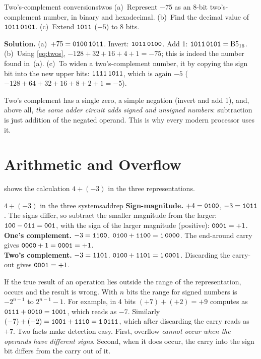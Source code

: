 \begin{example}{Two's-complement conversions}{twos}
(a)~Represent $-75$ as an 8-bit two's-complement number, in binary and hexadecimal. (b)~Find the decimal value of $\mathtt{1011\,0101}$. (c)~Extend $\mathtt{1011}$ ($-5$) to 8 bits.

\textbf{Solution.} (a)~$+75=\mathtt{0100\,1011}$. Invert: $\mathtt{1011\,0100}$. Add 1: $\mathtt{1011\,0101}=\mathrm{B5}_{16}$. (b)~Using \cref{eq:twos}, $-128+32+16+4+1=-75$; this is indeed the number found in~(a). (c)~To widen a two's-complement number,  it by copying the sign bit into the new upper bits: $\mathtt{1111\,1011}$, which is again $-5$ ($-128+64+32+16+8+2+1=-5$).
\end{example}

\begin{keypoint}
Two's complement has a single zero, a simple negation (invert and add 1), and, above all, \emph{the same adder circuit adds signed and unsigned numbers}: subtraction is just addition of the negated operand. This is why every modern processor uses it.
\end{keypoint}

\section{Arithmetic and Overflow}\label{sec:overflow}
 shows the calculation $4+(-3)$ in the three representations.

\begin{example}{$4+(-3)$ in the three systems}{addrep}
\textbf{Sign-magnitude.} $+4=\mathtt{0100}$, $-3=\mathtt{1011}$. The signs differ, so subtract the smaller magnitude from the larger: $\mathtt{100}-\mathtt{011}=\mathtt{001}$, with the sign of the larger magnitude (positive): $\mathtt{0001}=+1$.\\
\textbf{One's complement.} $-3=\mathtt{1100}$. $\mathtt{0100}+\mathtt{1100}=\mathtt{1\,0000}$. The end-around carry gives $\mathtt{0000}+1=\mathtt{0001}=+1$.\\
\textbf{Two's complement.} $-3=\mathtt{1101}$. $\mathtt{0100}+\mathtt{1101}=\mathtt{1\,0001}$. Discarding the carry-out gives $\mathtt{0001}=+1$.
\end{example}

If the true result of an operation lies outside the range of the representation,  occurs and the result is wrong. With $n$ bits the range for signed numbers is $-2^{n-1}$ to $2^{n-1}-1$. For example, in 4 bits $(+7)+(+2)=+9$ computes as $\mathtt{0111}+\mathtt{0010}=\mathtt{1001}$, which reads as $-7$. Similarly $(-7)+(-2)=\mathtt{1001}+\mathtt{1110}=\mathtt{1\,0111}$, which after discarding the carry reads as $+7$. Two facts make detection easy. First, overflow \emph{cannot occur when the operands have different signs}. Second, when it does occur, the carry into the sign bit differs from the carry out of it.

